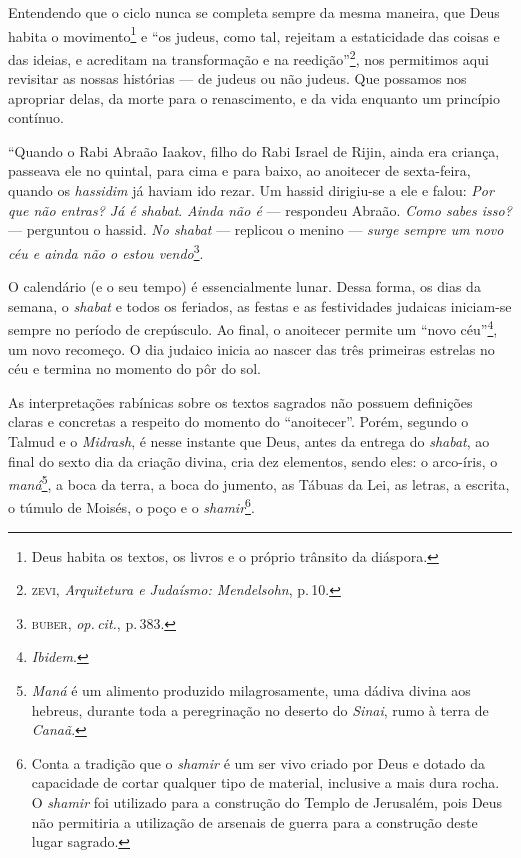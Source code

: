Entendendo que o ciclo nunca se completa sempre da mesma maneira, que
Deus habita o movimento\footnote{Deus habita os textos, os livros e o
  próprio trânsito da diáspora.} e ``os judeus, como tal, rejeitam
a estaticidade das coisas e das ideias, e acreditam na transformação e
na reedição''\footnote{\textsc{zevi}, \emph{Arquitetura e Judaísmo: Mendelsohn},
  p.\,10.}, nos permitimos aqui revisitar as nossas histórias --- de
judeus ou não judeus. Que possamos nos apropriar delas, da morte para o
renascimento, e da vida enquanto um princípio contínuo.

\begin{center}\end{center}

\noindent{}``Quando o Rabi Abraão Iaakov, filho do Rabi Israel de Rijin,
ainda era criança, passeava ele no quintal, para cima e para baixo, ao
anoitecer de sexta-feira, quando os \emph{hassidim} já haviam ido rezar. Um
hassid dirigiu-se a ele e falou: \emph{Por que não entras? Já é \emph{shabat}}.
\emph{Ainda não é} --- respondeu Abraão. \emph{Como sabes isso?} --- perguntou o
hassid. \emph{No \emph{shabat}} --- replicou o menino --- \emph{surge sempre um novo céu
e ainda não o estou vendo}\footnote{\textsc{buber}, \emph{op.\,cit.}, p.\,383.}.

O calendário (e o seu tempo) é essencialmente lunar. Dessa forma, os
dias da semana, o \emph{shabat} e todos os feriados, as festas e as
festividades judaicas iniciam-se sempre no período de crepúsculo. Ao
final, o anoitecer permite um ``novo céu''\footnote{\emph{Ibidem}.}, um
novo recomeço. O dia judaico inicia ao nascer das três primeiras
estrelas no céu e termina no momento do pôr do sol.

As interpretações rabínicas sobre os textos sagrados não possuem
definições claras e concretas a respeito do momento do ``anoitecer''.
Porém, segundo o Talmud e o \emph{Midrash}, é nesse instante que
Deus, antes da entrega do \emph{shabat}, ao final do sexto dia da
criação divina, cria dez elementos, sendo eles: o arco-íris, o
\emph{maná}\footnote{\emph{Maná} é um alimento produzido milagrosamente,
  uma dádiva divina aos hebreus, durante toda a peregrinação no deserto
  do \emph{Sinai}, rumo à terra de \emph{Canaã}.}, a boca da terra, a
boca do jumento, as Tábuas da Lei, as letras, a escrita, o túmulo de
Moisés, o poço e o \emph{shamir}\footnote{Conta a tradição que o
  \emph{shamir} é um ser vivo criado por Deus e dotado da capacidade de
  cortar qualquer tipo de material, inclusive a mais dura rocha. O
  \emph{shamir} foi utilizado para a construção do Templo de Jerusalém,
  pois Deus não permitiria a utilização de arsenais de guerra para a
  construção deste lugar sagrado.}.


